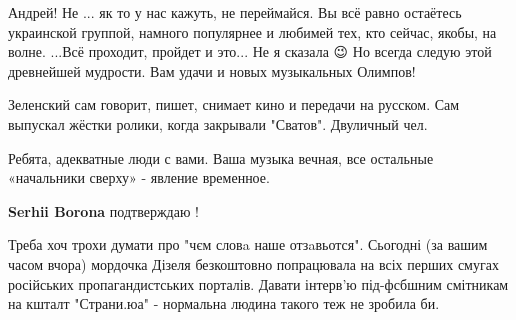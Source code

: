 \begin{itemize}
Андрей! Не ... як то у нас кажуть, не переймайся. Вы всё равно остаётесь
украинской группой, намного популярнее и любимей тех, кто сейчас, якобы, на
волне. ...Всё проходит, пройдет и это... Не я сказала 😉 Но всегда следую этой
древнейшей мудрости. Вам удачи и новых музыкальных Олимпов!


 
Зеленский сам говорит, пишет, снимает кино и передачи на русском. Сам выпускал
жёстки ролики, когда закрывали "Сватов". Двуличный чел.

 
Ребята, адекватные люди с вами. Ваша музыка вечная, все остальные «начальники сверху» - явление временное.

\begin{itemize}
 
\textbf{Serhii Borona} подтверждаю !
\end{itemize}

 

Треба хоч трохи думати про "чєм словa наше отзaвьотся". Сьогодні (за вашим
часом вчора) мордочка Дізеля безкоштовно попрацювала на всіх перших смугах
російських пропагандистських порталів. Давати інтерв'ю під-фсбшним смітникам на
кшталт "Страни.юа" - нормальна людина такого теж не зробила би.

\begin{itemize}
 

\end{itemize}
\end{itemize}
